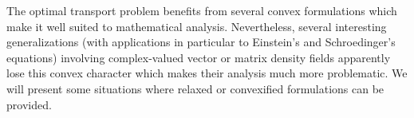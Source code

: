 \mypage
{}
\begin{myabstract}
The optimal transport problem benefits from several convex formulations which make it well suited to mathematical analysis. Nevertheless, several interesting generalizations (with applications in particular to Einstein's and Schroedinger's equations) involving complex-valued vector or matrix density fields apparently lose this convex character which makes their analysis much more problematic. We will present some situations where relaxed or convexified formulations can be provided.
\end{myabstract}
